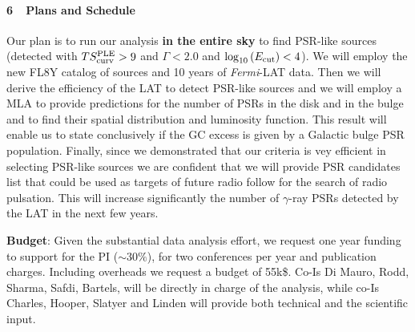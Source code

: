 \documentclass[12pt,twoside,letterpaper,onecolumn,english]{article}
\begin{document}
\paragraph{6\ \ Plans and Schedule}
Our plan is to run our analysis {\bf in the entire sky} to find PSR-like sources (detected with $TS^{\rm{PLE}}_{\rm{curv}}>9$ and $\Gamma<2.0$ and $\log_{10}{(E_{\rm{cut}})}<4$).
We will employ the new FL8Y catalog of sources and 10 years of {\it Fermi}-LAT data.
Then we will derive the efficiency of the LAT to detect PSR-like sources and we will employ a MLA to provide predictions for the number of PSRs in the disk and in the bulge and to find their spatial distribution and luminosity function.
This result will enable us to state conclusively if the GC excess is given by a Galactic bulge PSR population.
Finally, since we demonstrated that our criteria is vey efficient in selecting PSR-like sources we are confident that we will provide PSR candidates list that could be used as targets of future radio follow for the search of radio pulsation. This will increase significantly the number of $\gamma$-ray PSRs detected by the LAT in the next few years.


{\bf Budget}: Given the substantial data analysis effort, we request one year funding to support for the PI ($\sim 30\%$), for two conferences per year and publication charges. Including overheads we request a budget of 55k\$. Co-Is Di Mauro, Rodd, Sharma, Safdi, Bartels, will be directly in charge of the analysis, while co-Is Charles, Hooper, Slatyer and Linden will provide both technical and the scientific input.



{\footnotesize
\begin{multicols}{2}


\end{multicols}
}
\end{document}
